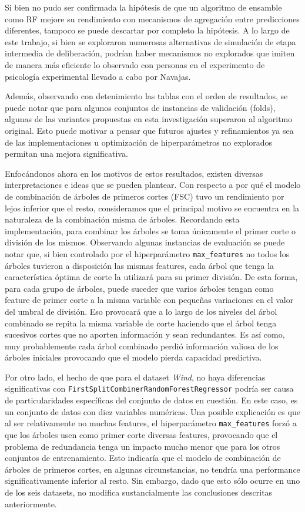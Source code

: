 Si bien no pudo ser confirmada la hipótesis de que un algoritmo de ensamble como RF mejore su rendimiento con mecanismos de agregación entre predicciones diferentes, tampoco se puede descartar por completo la hipótesis. A lo largo de este trabajo, si bien se exploraron numerosas alternativas de simulación de etapa intermedia de deliberación, podrían haber mecanismos no explorados que imiten de manera más eficiente lo observado con personas en el experimento de psicología experimental llevado a cabo por Navajas.

Además, observando con detenimiento las tablas con el orden de resultados, se puede notar que para algunos conjuntos de instancias de validación (folds), algunas de las variantes propuestas en esta investigación superaron al algoritmo original. Esto puede motivar a pensar que futuros ajustes y refinamientos ya sea de las implementaciones u optimización de hiperparámetros no explorados permitan una mejora significativa.

Enfocándonos ahora en los motivos de estos resultados, existen diversas interpretaciones e ideas que se pueden plantear. Con respecto a por qué el modelo de combinación de árboles de primeros cortes (FSC) tuvo un rendimiento por lejos inferior que el resto, consideramos que el principal motivo se encuentra en la naturaleza de la combinación misma de árboles. Recordando esta implementación, para combinar los árboles se toma únicamente el primer corte o división de los mismos. Observando algunas instancias de evaluación se puede notar que, si bien controlado por el hiperparámetro \texttt{max\_features} no todos los árboles tuvieron a disposición las mismas features, cada árbol que tenga la característica óptima de corte la utilizará para su primer división. De esta forma, para cada grupo de árboles, puede suceder que varios árboles tengan como feature de primer corte a la misma variable con pequeñas variaciones en el valor del umbral de división. Eso provocará que a lo largo de los niveles del árbol combinado se repita la misma variable de corte haciendo que el árbol tenga sucesivos cortes que no aporten información y sean redundantes. Es así como, muy probablemente cada árbol combinado perdió información valiosa de los árboles iniciales provocando que el modelo pierda capacidad predictiva.

Por otro lado, el hecho de que para el dataset \textit{Wind}, no haya diferencias significativas con \texttt{FirstSplitCombinerRandomForestRegressor} podría ser causa de particularidades específicas del conjunto de datos en cuestión. En este caso, es un conjunto de datos con diez variables numéricas. Una posible explicación es que al ser relativamente no muchas features, el hiperparámetro \texttt{max\_features} forzó a que los árboles usen como primer corte diversas features, provocando que el problema de redundancia tenga un impacto mucho menor que para los otros conjuntos de entrenamiento. Esto indicaría que el modelo de combinación de árboles de primeros cortes, en algunas circunstancias, no tendría una performance significativamente inferior al resto. Sin embargo, dado que esto sólo ocurre en uno de los seis datasets, no modifica sustancialmente las conclusiones descritas anteriormente.

